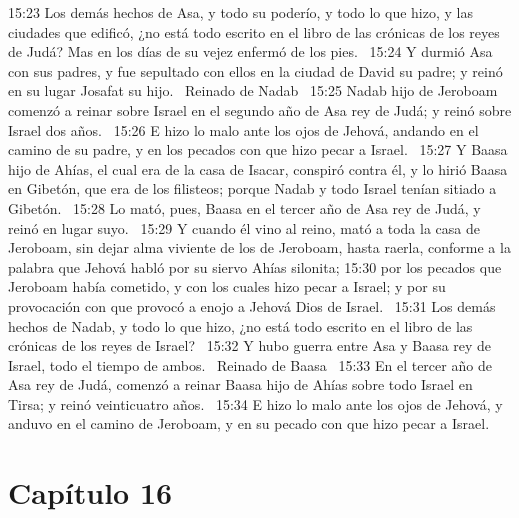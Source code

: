 15:23 Los demás hechos de Asa, y todo su poderío, y todo lo que hizo, y las ciudades que edificó, ¿no está todo escrito en el libro de las crónicas de los reyes de Judá? Mas en los días de su vejez enfermó de los pies.  
15:24 Y durmió Asa con sus padres, y fue sepultado con ellos en la ciudad de David su padre; y reinó en su lugar Josafat su hijo.  
Reinado de Nadab  
15:25 Nadab hijo de Jeroboam comenzó a reinar sobre Israel en el segundo año de Asa rey de Judá; y reinó sobre Israel dos años.  
15:26 E hizo lo malo ante los ojos de Jehová, andando en el camino de su padre, y en los pecados con que hizo pecar a Israel.  
15:27 Y Baasa hijo de Ahías, el cual era de la casa de Isacar, conspiró contra él, y lo hirió Baasa en Gibetón, que era de los filisteos; porque Nadab y todo Israel tenían sitiado a Gibetón.  
15:28 Lo mató, pues, Baasa en el tercer año de Asa rey de Judá, y reinó en lugar suyo.  
15:29 Y cuando él vino al reino, mató a toda la casa de Jeroboam, sin dejar alma viviente de los de Jeroboam, hasta raerla, conforme a la palabra que Jehová habló por su siervo Ahías silonita; 
15:30 por los pecados que Jeroboam había cometido, y con los cuales hizo pecar a Israel; y por su provocación con que provocó a enojo a Jehová Dios de Israel.  
15:31 Los demás hechos de Nadab, y todo lo que hizo, ¿no está todo escrito en el libro de las crónicas de los reyes de Israel?  
15:32 Y hubo guerra entre Asa y Baasa rey de Israel, todo el tiempo de ambos.  
Reinado de Baasa  
15:33 En el tercer año de Asa rey de Judá, comenzó a reinar Baasa hijo de Ahías sobre todo Israel en Tirsa; y reinó veinticuatro años.  
15:34 E hizo lo malo ante los ojos de Jehová, y anduvo en el camino de Jeroboam, y en su pecado con que hizo pecar a Israel.  
\section*{Capítulo 16 }

